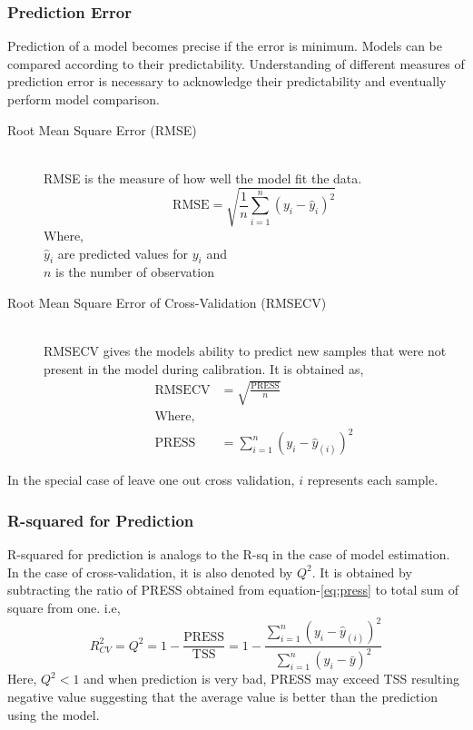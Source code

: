 \documentclass[12pt, lot, lof]{thesis}\usepackage[]{graphicx}\usepackage[]{color}
\begin{document}
\subsubsection{Prediction Error}
\label{sssec:predErr}
Prediction of a model becomes precise if the error is minimum. Models can be compared according to their predictability. Understanding of different measures of prediction error is necessary to acknowledge their predictability and eventually perform model comparison.
\begin{description}
\item[Root Mean Square Error (RMSE)]\hfill\\
RMSE is the measure of how well the model fit the data.
\begin{equation}
\text{RMSE}=\sqrt{\frac{1}{n}\sum_{i=1}^n{\left(y_i-\hat{y}_i\right)^2}}
\end{equation}
Where, \\
$\hat{y}_i$ are predicted values for $y_i$ and\\
$n$ is the number of observation

\item[Root Mean Square Error of Cross-Validation (RMSECV)]\hfill\\
RMSECV gives the models ability to predict new samples that were not present in the model during calibration. It is obtained as,
\begin{align}
\text{RMSECV} &=\sqrt{\frac{\text{PRESS}}{n}} \label{eq:rmsecv}\\
\text{Where, } & \nonumber \\
\text{PRESS} &=\sum_{i=1}^n{\left(y_i-\hat{y}_{(i)}\right)^2} \label{eq:press}
\end{align}
\end{description}
In the special case of leave one out cross validation, $i$ represents each sample.

\subsubsection{R-squared for Prediction}
\label{sssec:rseqPred}
R-squared for prediction is analogs to the R-sq in the case of model estimation. In the case of cross-validation, it is also denoted by $Q^2$. It is obtained by subtracting the ratio of PRESS obtained from equation-\ref{eq:press} to total sum of square from one. i.e,
\begin{equation}
\label{eq:rsqpred}
R^2_{CV}=Q^2=1-\frac{\text{PRESS}}{\text{TSS}} = 1-\frac{\sum_{i=1}^n{\left(y_i-\hat{y}_{(i)}\right)^2}}{\sum_{i=1}^n{\left(y_i-\bar{y}\right)^2}}
\end{equation}
Here, $Q^2<1$ and when prediction is very bad, PRESS may exceed TSS resulting negative value suggesting that the average value is better than the prediction using the model. 
\end{document}
